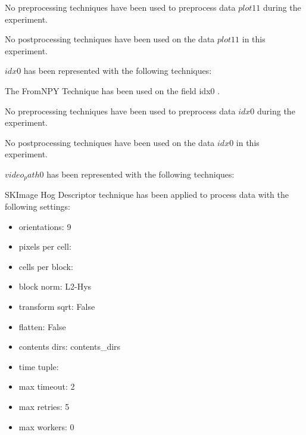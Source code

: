 \documentclass[11pt]{article}
\begin{document}
No preprocessing techniques have been used to preprocess data $ plot11 $ during the experiment.
\hfill\break
\hfill\break



No postprocessing techniques have been used on the data $ plot11 $ in this experiment.
\hfill\break
\hfill\break



$ idx0 $  has been represented with the following techniques:
\hfill\break
\hfill\break



The FromNPY Technique has been used on the field idx0 .
\hfill\break
\hfill\break



No preprocessing techniques have been used to preprocess data $ idx0 $ during the experiment.
\hfill\break
\hfill\break



No postprocessing techniques have been used on the data $ idx0 $ in this experiment.
\hfill\break
\hfill\break



$ video_path0 $  has been represented with the following techniques:
\hfill\break
\hfill\break



SKImage Hog Descriptor technique has been applied to process data with the following settings:
\begin{itemize}
    \item orientations: 9
    \item pixels per cell:
    \item cells per block:
    \item block norm: L2-Hys
    \item transform sqrt: False
    \item flatten: False
    \item contents dirs: contents\_dirs
    \item time tuple:
    \item max timeout: 2
    \item max retries: 5
    \item max workers: 0
\end{itemize}
\hfill\break
\hfill\break
\end{document}
